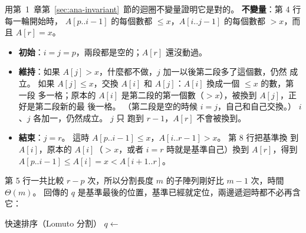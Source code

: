 \begin{center}
\label{fig:so-lomuto}
\end{center}

用第~1~章第~\ref{sec:ana-invariant}~節的迴圈不變量證明它是對的。 \textbf{不變量}：第 4 行每一輪開始時，
$A[p..i-1]$ 的每個數都 $\le x$，$A[i..j-1]$ 的每個數都 $> x$，而且 $A[r] = x$。

\begin{itemize}
\item \textbf{初始}：$i = j = p$，兩段都是空的；$A[r]$ 還沒動過。
\item \textbf{維持}：如果 $A[j] > x$，什麼都不做，$j$ 加一以後第二段多了這個數，仍然
成立。 如果 $A[j] \le x$，交換 $A[i]$ 和 $A[j]$：$A[i]$ 換成一個 $\le x$ 的數，第一段
多一格；原本的 $A[i]$ 是第二段的第一個數（$> x$），被換到 $A[j]$，正好是第二段新的最
後一格。 （第二段是空的時候 $i = j$，自己和自己交換。） $i$、$j$ 各加一，仍然成立。 $j$ 只
跑到 $r - 1$，$A[r]$ 不會被換到。
\item \textbf{結束}：$j = r$。 這時 $A[p..i-1] \le x$，$A[i..r-1] > x$。 第 8 行把基準換
到 $A[i]$，原本的 $A[i]$（$> x$，或者 $i = r$ 時就是基準自己）換到 $A[r]$，得到
$A[p..i-1] \le A[i] = x < A[i+1..r]$。
\end{itemize}

第 5 行一共比較 $r - p$ 次，所以分割長度 $m$ 的子陣列剛好比 $m - 1$ 次，時間
$\Theta(m)$。 回傳的 $q$ 是基準最後的位置，基準已經就定位，兩邊遞迴時都不必再含它：

\begin{pseudo}[label=alg:so-quick]{快速排序（Lomuto 分割）}
        \State $q \gets$ 
        \State {}
        \State {}
    \EndIf
\EndProcedure
\end{pseudo}

